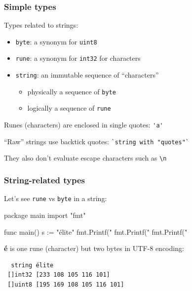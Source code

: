 \documentclass[handout,compress,t,11pt]{beamer}
\begin{document}
\begin{frame}[fragile]
    \frametitle{Simple types}
    Types related to strings:
    \begin{itemize}
        \item \verb|byte|: a synonym for \verb|uint8| \\
        \vspace{0.5\baselineskip}

        \item \verb|rune|: a synonym for \verb|int32| for characters \\
        \vspace{0.5\baselineskip}

        \item \verb|string|: an immutable sequence of ``characters'' \\
        \begin{itemize}
        \item physically a sequence of \verb|byte|
        \item logically a sequence of \verb|rune|
        \end{itemize}
    \end{itemize}
    \vspace{\baselineskip}
    Runes (characters) are enclosed in single quotes: \verb|'a'| \par
    \vspace{\baselineskip}
    ``Raw'' strings use backtick quotes: \verb|`string with "quotes"`| \par
    \vspace{0.4\baselineskip}
    They also don't evaluate escape characters such as \verb|\n|
\end{frame}

\begin{frame}[fragile]
    \frametitle{String-related types}
    Let's see \verb|rune| vs \verb|byte| in a string:
\begin{golang}
package main
import "fmt"

func main() {
    s := "élite"
	fmt.Printf("%
	fmt.Printf("%
	fmt.Printf("%
}
\end{golang}
\vspace{0.5\baselineskip}
{\bf é} is one rune (character) but two bytes in UTF-8 encoding:
\begin{verbatim}
  string élite
 []int32 [233 108 105 116 101]
 []uint8 [195 169 108 105 116 101]
\end{verbatim}
\end{frame}
\end{document}

